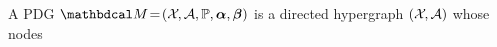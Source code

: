 \begin{defn}
    A PDG $\dg M \!=\! (\X\mskip-2mu, \Ar,
        \mathbb P, 
        \balpha, \bbeta )
    $
    is     
    a directed hypergraph 
    $(\mathcal X\mskip-2mu, \mathcal A)$ 
    whose nodes 

\end{defn}

